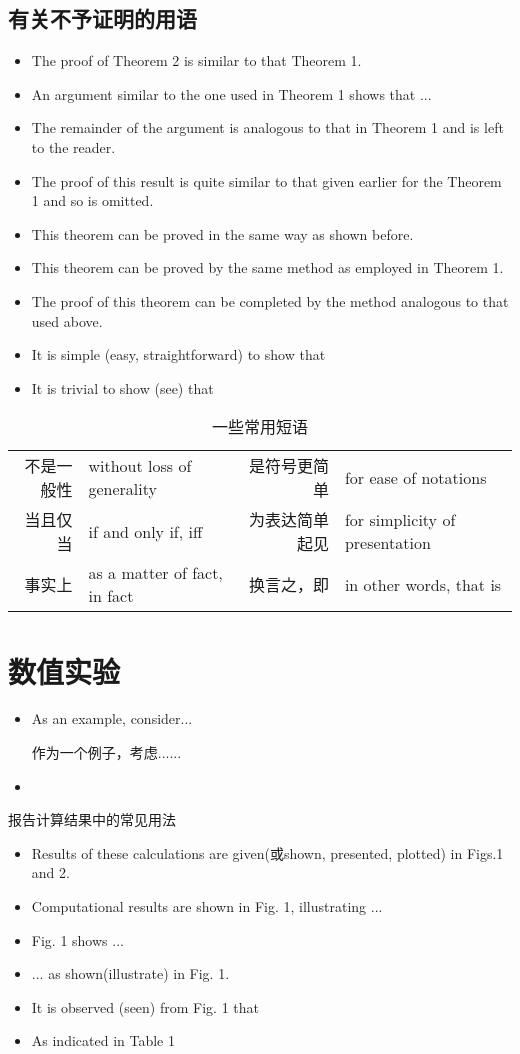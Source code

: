 \documentclass[11pt,final]{article}
\numberwithin{equation}{section}
\begin{document}
\subsection{有关不予证明的用语}
\begin{itemize}
	\item The proof of Theorem 2 is similar to that Theorem 1.
	\item An argument similar to the one used in Theorem 1 shows that ...
	\item The remainder of the argument is analogous to that in Theorem 1 and is left to the reader.
	\item The proof of this result is quite similar to that given earlier for the Theorem 1 and so is omitted.
	\item This theorem can be proved in the same way as shown before.
	\item This theorem can be proved by the same method as employed in Theorem 1.
	\item The proof of this theorem can be completed by the method analogous to that used above. 
	\item It is simple (easy, straightforward) to show that
	\item It is trivial to show (see) that
\end{itemize}
\begin{table}[h]
\centering
\caption{一些常用短语}
\begin{tabular}{rlrl}
	\hline 
	不是一般性&without loss of generality  &是符号更简单  &for ease of notations  \\ 
	
	当且仅当& if and only if, iff  &  为表达简单起见&for simplicity of presentation  \\ 
	
	事实上&as a matter of fact, in fact  & 换言之，即 & in other words, that is  \\  
	\hline 
\end{tabular} 
\end{table}

\section{数值实验}
\begin{itemize}
	\item As an example, consider...
	
	作为一个例子，考虑......
	\item 
\end{itemize}
\noindent 报告计算结果中的常见用法
\begin{itemize}
	\item Results of these calculations are given(或shown, presented, plotted) in Figs.1 and 2.
	\item Computational results are shown in Fig. 1, illustrating ...
	\item Fig. 1 shows ...
	\item ... as shown(illustrate) in Fig. 1.
	\item It is observed (seen) from Fig. 1 that
	\item As indicated in Table 1
\end{itemize}
\end{document}
